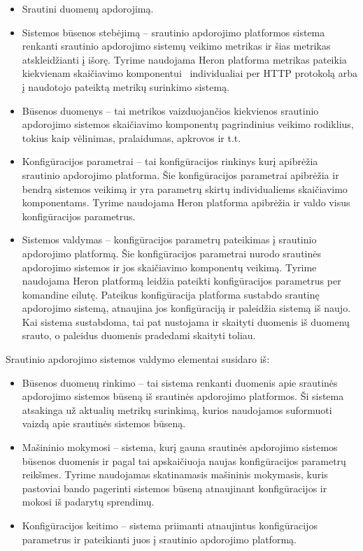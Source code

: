 \documentclass{VUMIFPSbakalaurinis}
\begin{document}
\begin{itemize}
    \item Srautini duomenų apdorojimą.
    \item Sistemos būsenos stebėjimą – srautinio apdorojimo platformos sistema renkanti srautinio apdorojimo sistemų veikimo metrikas ir šias metrikas atskleidžianti į išorę. Tyrime naudojama Heron platforma metrikas pateikia kiekvienam skaičiavimo komponentui  individualiai per HTTP protokolą arba į naudotojo pateiktą metrikų surinkimo sistemą.
    \item Būsenos duomenys – tai metrikos vaizduojančios kiekvienos srautinio apdorojimo sistemos skaičiavimo komponentų pagrindinius veikimo rodiklius, tokius kaip vėlinimas, pralaidumas, apkrovos ir t.t.
    \item Konfigūracijos parametrai – tai konfigūracijos rinkinys kurį apibrėžia srautinio apdorojimo platforma. Šie konfigūracijos parametrai apibrėžia ir bendrą sistemos veikimą ir yra parametrų skirtų individualiems skaičiavimo komponentams. Tyrime naudojama Heron platforma apibrėžia ir valdo visus konfigūracijos parametrus.
    \item Sistemos valdymas – konfigūracijos parametrų pateikimas į srautinio apdorojimo platformą. Šie konfigūracijos parametrai nurodo srautinės apdorojimo sistemos ir jos skaičiavimo komponentų veikimą. Tyrime naudojama Heron platformą leidžia pateikti konfigūracijos parametrus per komandine eilutę. Pateikus konfigūracija platforma sustabdo srautinę apdorojimo sistemą, atnaujina jos konfigūraciją ir paleidžia sistemą iš naujo. Kai sistema sustabdoma, tai pat nustojama ir skaityti duomenis iš duomenų srauto, o paleidus duomenis pradedami skaityti toliau.
\end{itemize}
Srautinio apdorojimo sistemos valdymo elementai susidaro iš:
\begin{itemize}
    \item Būsenos duomenų rinkimo – tai sistema renkanti duomenis apie srautinės apdorojimo sistemos būseną iš srautinės apdorojimo platformos. Ši sistema atsakinga už aktualių metrikų surinkimą, kurios naudojamos suformuoti vaizdą apie srautinės sistemos būseną.
    \item Mašininio mokymosi – sistema, kurį gauna srautinės apdorojimo sistemos būsenos duomenis ir pagal tai apskaičiuoja naujas konfigūracijos parametrų reikšmes. Tyrime naudojamas skatinamasis mašininis mokymasis, kuris pastoviai bando pagerinti sistemos būseną atnaujinant konfigūracijos ir mokosi iš padarytų sprendimų.
    \item Konfigūracijos keitimo – sistema priimanti atnaujintus konfigūracijos parametrus ir pateikianti juos į srautinio apdorojimo platformą. 
\end{itemize}
\end{document}
